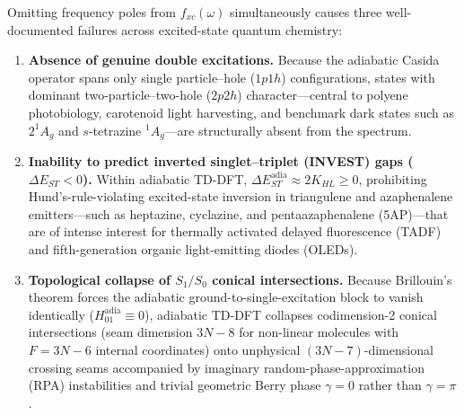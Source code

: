 \documentclass[10pt,twocolumn]{article}
\theoremstyle{natthm}
\newcommand{\dEST}{\Delta E_{ST}}
\begin{document}
Omitting frequency poles from $f_{xc}(\omega)$ simultaneously causes three well-documented failures across excited-state quantum chemistry\cite{maitra2004,levine2006,maitra2022}:
\begin{enumerate}
  \setlength{\itemsep}{1pt}
  \item \textbf{Absence of genuine double excitations.} Because the adiabatic Casida operator spans only single particle--hole ($1p1h$) configurations, states with dominant two-particle--two-hole ($2p2h$) character---central to polyene photobiology, carotenoid light harvesting, and benchmark dark states such as $2^1A_g$ and $s$-tetrazine $^1A_g$---are structurally absent from the spectrum\cite{maitra2004,cave2004,loos2019doubles,kossoski2024doubles}.
  \item \textbf{Inability to predict inverted singlet--triplet (INVEST) gaps ($\dEST<0$).} Within adiabatic TD-DFT, $\dEST^{\mathrm{adia}}\approx 2K_{HL}\ge 0$, prohibiting Hund's-rule-violating excited-state inversion\cite{kollmar1978,leupin1980} in triangulene and azaphenalene emitters---such as heptazine, cyclazine, and pentaazaphenalene (5AP)---that are of intense interest for thermally activated delayed fluorescence (TADF) and fifth-generation organic light-emitting diodes (OLEDs)\cite{uoyama2012tadf,desilva2019,ehrmaier2019,ricci2021,sanzrodrigo2021,pollice2021,sobolewski2021,dinkelbach2021,aizawa2022,loos2023invest,wilson2024,rishi2025}.
  \item \textbf{Topological collapse of $S_1/S_0$ conical intersections.} Because Brillouin's theorem forces the adiabatic ground-to-single-excitation block to vanish identically ($H_{01}^{\mathrm{adia}}\equiv 0$), adiabatic TD-DFT collapses codimension-2 conical intersections (seam dimension $3N{-}8$ for non-linear molecules with $F=3N{-}6$ internal coordinates) onto unphysical $(3N{-}7)$-dimensional crossing seams accompanied by imaginary random-phase-approximation (RPA) instabilities and trivial geometric Berry phase $\gamma=0$ rather than $\gamma=\pi$\cite{longuethiggins1958,herzberg1963,mead1979,berry1984,yarkony1996,domcke2004,levine2006,gozem2014}.
\end{enumerate}
\end{document}
